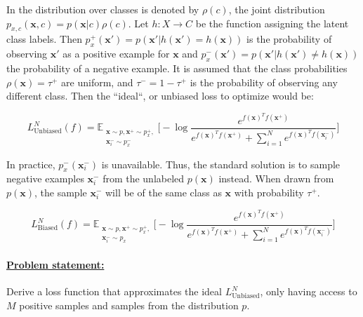 \documentclass{article}
\begin{document}
In \citep{chuang2021debiased} the distribution over classes is denoted by $\rho(c)$, the joint distribution $p_{x,c}(\textbf{x}, c) = p(\textbf{x}|c)\rho(c)$. Let $h : X \rightarrow C$ be the function assigning the latent class labels. Then $p^+_x(\textbf{x}') = p(\textbf{x}'|h(\textbf{x}') = h(\textbf{x}))$ is the probability of observing $\textbf{x}'$ as a positive example for $\textbf{x}$ and $p^-_x(\textbf{x}') = p(\textbf{x}'|h(\textbf{x}') \neq h(\textbf{x}))$ the probability of a negative example. It is assumed that the class probabilities $\rho(\textbf{x}) = \tau^+$ are uniform, and $\tau^- = 1 - \tau^+$ is the probability of observing any different class. Then the  ``ideal``, or unbiased loss to optimize would be:

\begin{equation}  \label{eq:2}
L_{\text{Unbiased}}^N(f) = \mathbb{E}_{\substack{\textbf{x} \sim p, \textbf{x}^+ \sim p^+_x,\\ \textbf{x}_i^- \sim p_x^-}} \bigg[-\log \frac{e^{f(\textbf{x})^T f(\textbf{x}^+)}}{e^{f(\textbf{x})^T f(\textbf{x}^+)} + \sum _{i=1}^N e^{f(\textbf{x})^T f(\textbf{x}_i^-)}}\bigg]
\end{equation}


In practice, $p_x^-(\textbf{x}_i^-)$ is unavailable. Thus, the standard solution is to sample negative examples $\textbf{x}_i^-$ from the unlabeled $p(\textbf{x})$ instead. When drawn from $p(\textbf{x})$, the sample $\textbf{x}_i^-$ will be of the same class as $\textbf{x}$ with probability $\tau^+$.

\begin{equation} \label{eq:3}
L_{\text{Biased}}^N(f) = \mathbb{E}_{\substack{\textbf{x} \sim p, \textbf{x}^+ \sim p^+_x,\\ \textbf{x}_i^- \sim p_x}} \bigg[-\log \frac{e^{f(\textbf{x})^T f(\textbf{x}^+)}}{e^{f(\textbf{x})^T f(\textbf{x}^+)} + \sum _{i=1}^N e^{f(\textbf{x})^T f(\textbf{x}_i^-)}}\bigg]
\end{equation}

\paragraph{\underline{Problem statement:}} Derive a loss function that approximates the ideal $L_{\text{Unbiased}}^N$, only having access to $M$ positive samples and samples from the distribution $p$.
\end{document}
